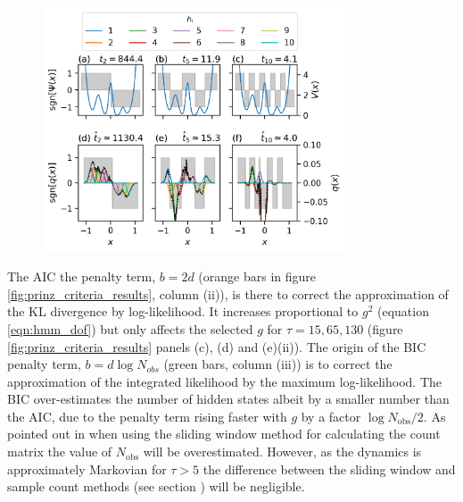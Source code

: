 \begin{figure}
    \centering
    \includegraphics[width=0.8\textwidth]{chapters/hmm_selection/figures/hmm_tau_8_g_10.png}
    \label{fig:prinz_tau8_g10}
\end{figure}

The AIC the penalty term, $b=2d$ (orange bars in figure \ref{fig:prinz_criteria_results}, column (ii)), is there to correct the approximation of the KL divergence by log-likelihood. It increases proportional to $g^{2}$ (equation \ref{eqn:hmm_dof}) but only affects the selected $g$ for $\tau=15, 65, 130$ (figure \ref{fig:prinz_criteria_results} panels (c), (d) and (e)(ii)). The origin of the BIC penalty term, $b=d\log{N_{obs}}$ (green bars, column (iii)) is to correct the approximation of the integrated likelihood by the maximum log-likelihood. The BIC over-estimates the number of hidden states albeit by a smaller number than the AIC, due to the penalty term rising faster with $g$ by a factor $\log{N_{\mathrm{obs}}}/2$. As pointed out in \cite{mcgibbonStatisticalModelSelection2014a} when using the sliding window method for calculating the count matrix the value of $N_{\mathrm{obs}}$  will be overestimated. However, as the dynamics is approximately Markovian for $\tau > 5$ the difference between the sliding window and sample count methods (see section \label{sec:theory_count_mat}) will be negligible. 

